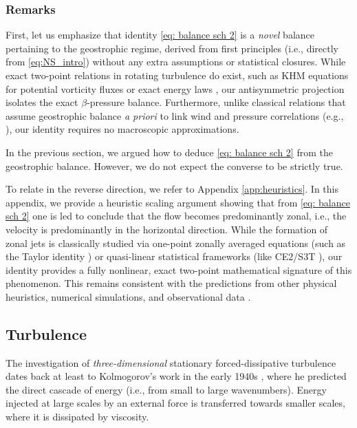 \documentclass[11pt,a4paper]{article}
\numberwithin{equation}{section}
\numberwithin{theorem}{section}
\numberwithin{remark}{section}
\numberwithin{definition}{section}
\begin{document}
\subsubsection{Remarks}
First, let us emphasize that identity \eqref{eq: balance sch 2} is a \textit{novel} balance pertaining to the geostrophic regime, derived from first principles (i.e., directly from \eqref{eq:NS_intro}) without any extra assumptions or statistical closures. While exact two-point relations in rotating turbulence do exist, such as KHM equations for potential vorticity fluxes \cite{kurien_PV} or exact energy laws \cite{galtier}, our antisymmetric projection isolates the exact $\beta$-pressure balance. Furthermore, unlike classical relations that assume geostrophic balance \textit{a priori} to link wind and pressure correlations (e.g., \cite{buell}), our identity requires no macroscopic approximations.

In the previous section, we argued how to deduce \eqref{eq: balance sch 2} from the geostrophic balance. However, we do not expect the converse to be strictly true.

To relate in the reverse direction, we refer to Appendix \ref{app:heuristics}. In this appendix, we provide a heuristic scaling argument showing that from \eqref{eq: balance sch 2} one is led to conclude that the flow becomes predominantly zonal, i.e., the velocity is predominantly in the horizontal direction. While the formation of zonal jets is classically studied via one-point zonally averaged equations (such as the Taylor identity \cite{vallis1}) or quasi-linear statistical frameworks (like CE2/S3T \cite{Cost2, Cost}), our identity provides a fully nonlinear, exact two-point mathematical signature of this phenomenon. This remains consistent with the predictions from other physical heuristics, numerical simulations, and observational data \cite{Danilov, galerpin1, rhines, vallis4}.




\subsection{Turbulence}
The investigation of \textit{three-dimensional} stationary forced-dissipative turbulence dates back at least to Kolmogorov’s work in the early 1940s \cite{kolmogorov2,kolmogorov1,kolmogorov3}, where he predicted the direct cascade of energy (i.e., from small to large wavenumbers). Energy injected at large scales by an external force is transferred towards smaller scales, where it is dissipated by viscosity. 
\end{document}
